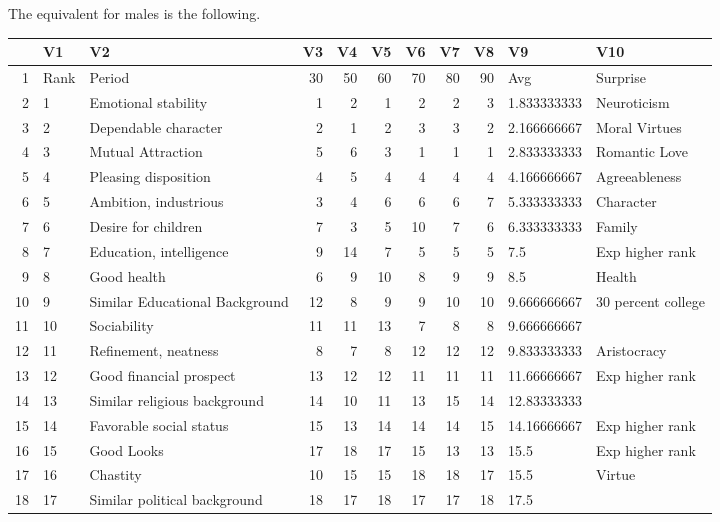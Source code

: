 \documentclass{article}
\begin{document}
The equivalent for males is the following.

\begin{table}[ht]
\centering
\begin{tabular}{rllrrrrrrll}
  \hline
 & V1 & V2 & V3 & V4 & V5 & V6 & V7 & V8 & V9 & V10 \\ 
  \hline
1 & Rank & Period &  30 &  50 &  60 &  70 &  80 &  90 & Avg & Surprise \\ 
  2 & 1 & Emotional stability &   1 &   2 &   1 &   2 &   2 &   3 & 1.833333333 & Neuroticism \\ 
  3 & 2 & Dependable character &   2 &   1 &   2 &   3 &   3 &   2 & 2.166666667 & Moral Virtues \\ 
  4 & 3 & Mutual Attraction &   5 &   6 &   3 &   1 &   1 &   1 & 2.833333333 & Romantic Love \\ 
  5 & 4 & Pleasing disposition &   4 &   5 &   4 &   4 &   4 &   4 & 4.166666667 & Agreeableness \\ 
  6 & 5 & Ambition, industrious &   3 &   4 &   6 &   6 &   6 &   7 & 5.333333333 & Character  \\ 
  7 & 6 & Desire for children &   7 &   3 &   5 &  10 &   7 &   6 & 6.333333333 & Family \\ 
  8 & 7 & Education, intelligence &   9 &  14 &   7 &   5 &   5 &   5 & 7.5 & Exp higher rank \\ 
  9 & 8 & Good health &   6 &   9 &  10 &   8 &   9 &   9 & 8.5 & Health \\ 
  10 & 9 & Similar Educational Background &  12 &   8 &   9 &   9 &  10 &  10 & 9.666666667 & 30 percent college \\ 
  11 & 10 & Sociability &  11 &  11 &  13 &   7 &   8 &   8 & 9.666666667 &  \\ 
  12 & 11 & Refinement, neatness &   8 &   7 &   8 &  12 &  12 &  12 & 9.833333333 & Aristocracy \\ 
  13 & 12 & Good financial prospect &  13 &  12 &  12 &  11 &  11 &  11 & 11.66666667 & Exp higher rank \\ 
  14 & 13 & Similar religious background &  14 &  10 &  11 &  13 &  15 &  14 & 12.83333333 &  \\ 
  15 & 14 & Favorable social status &  15 &  13 &  14 &  14 &  14 &  15 & 14.16666667 & Exp higher rank \\ 
  16 & 15 & Good Looks &  17 &  18 &  17 &  15 &  13 &  13 & 15.5 & Exp higher rank \\ 
  17 & 16 & Chastity &  10 &  15 &  15 &  18 &  18 &  17 & 15.5 & Virtue \\ 
  18 & 17 & Similar political background &  18 &  17 &  18 &  17 &  17 &  18 & 17.5 &  \\ 
   \hline
\end{tabular}
\end{table}
\end{document}
